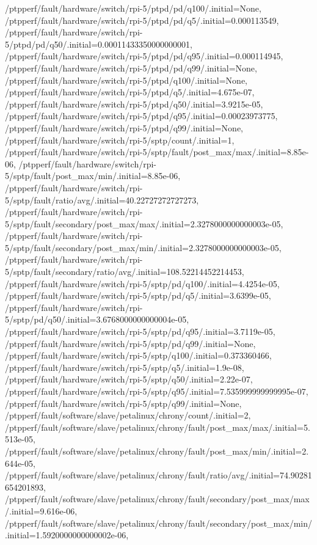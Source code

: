 {    /ptpperf/fault/hardware/switch/rpi-5/ptpd/pd/q100/.initial=None,
    /ptpperf/fault/hardware/switch/rpi-5/ptpd/pd/q5/.initial=0.000113549,
    /ptpperf/fault/hardware/switch/rpi-5/ptpd/pd/q50/.initial=0.00011433350000000001,
    /ptpperf/fault/hardware/switch/rpi-5/ptpd/pd/q95/.initial=0.000114945,
    /ptpperf/fault/hardware/switch/rpi-5/ptpd/pd/q99/.initial=None,
    /ptpperf/fault/hardware/switch/rpi-5/ptpd/q100/.initial=None,
    /ptpperf/fault/hardware/switch/rpi-5/ptpd/q5/.initial=4.675e-07,
    /ptpperf/fault/hardware/switch/rpi-5/ptpd/q50/.initial=3.9215e-05,
    /ptpperf/fault/hardware/switch/rpi-5/ptpd/q95/.initial=0.00023973775,
    /ptpperf/fault/hardware/switch/rpi-5/ptpd/q99/.initial=None,
    /ptpperf/fault/hardware/switch/rpi-5/sptp/count/.initial=1,
    /ptpperf/fault/hardware/switch/rpi-5/sptp/fault/post_max/max/.initial=8.85e-06,
    /ptpperf/fault/hardware/switch/rpi-5/sptp/fault/post_max/min/.initial=8.85e-06,
    /ptpperf/fault/hardware/switch/rpi-5/sptp/fault/ratio/avg/.initial=40.22727272727273,
    /ptpperf/fault/hardware/switch/rpi-5/sptp/fault/secondary/post_max/max/.initial=2.3278000000000003e-05,
    /ptpperf/fault/hardware/switch/rpi-5/sptp/fault/secondary/post_max/min/.initial=2.3278000000000003e-05,
    /ptpperf/fault/hardware/switch/rpi-5/sptp/fault/secondary/ratio/avg/.initial=108.52214452214453,
    /ptpperf/fault/hardware/switch/rpi-5/sptp/pd/q100/.initial=4.4254e-05,
    /ptpperf/fault/hardware/switch/rpi-5/sptp/pd/q5/.initial=3.6399e-05,
    /ptpperf/fault/hardware/switch/rpi-5/sptp/pd/q50/.initial=3.6768000000000004e-05,
    /ptpperf/fault/hardware/switch/rpi-5/sptp/pd/q95/.initial=3.7119e-05,
    /ptpperf/fault/hardware/switch/rpi-5/sptp/pd/q99/.initial=None,
    /ptpperf/fault/hardware/switch/rpi-5/sptp/q100/.initial=0.373360466,
    /ptpperf/fault/hardware/switch/rpi-5/sptp/q5/.initial=1.9e-08,
    /ptpperf/fault/hardware/switch/rpi-5/sptp/q50/.initial=2.22e-07,
    /ptpperf/fault/hardware/switch/rpi-5/sptp/q95/.initial=7.535999999999995e-07,
    /ptpperf/fault/hardware/switch/rpi-5/sptp/q99/.initial=None,
    /ptpperf/fault/software/slave/petalinux/chrony/count/.initial=2,
    /ptpperf/fault/software/slave/petalinux/chrony/fault/post_max/max/.initial=5.513e-05,
    /ptpperf/fault/software/slave/petalinux/chrony/fault/post_max/min/.initial=2.644e-05,
    /ptpperf/fault/software/slave/petalinux/chrony/fault/ratio/avg/.initial=74.90281654201893,
    /ptpperf/fault/software/slave/petalinux/chrony/fault/secondary/post_max/max/.initial=9.616e-06,
    /ptpperf/fault/software/slave/petalinux/chrony/fault/secondary/post_max/min/.initial=1.5920000000000002e-06,
}
